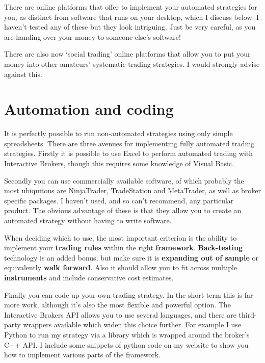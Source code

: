 There are online platforms that offer to implement your automated strategies for you, as distinct from software that runs on your desktop, which I discuss below. I haven't tested any of these but they look intriguing. Just be very careful, as you are handing over your money to someone else's software!

There are also now ‘social trading' online platforms that allow you to put your money into other amateurs' systematic trading strategies. I would strongly advise against this.

\section*{Automation and coding}  {}

It is perfectly possible to run non-automated strategies using only simple spreadsheets. There are three avenues for implementing fully automated trading strategies. Firstly it is possible to use Excel to perform automated trading with Interactive Brokers, though this requires some knowledge of Visual Basic.

Secondly you can use commercially available software, of which probably the most ubiquitous are NinjaTrader, TradeStation and MetaTrader, as well as broker specific packages. I haven't used, and so can't recommend, any particular product. The obvious advantage of these is that they allow you to create an automated strategy without having to write software.

When deciding which to use, the most important criterion is the ability to implement your \textbf{trading rules} within the right \textbf{framework}. \textbf{Back-testing} technology is an added bonus, but make sure it is \textbf{expanding out of sample} or equivalently \textbf{walk forward}. Also it should allow you to fit across multiple \textbf{instruments} and include conservative cost estimates.

Finally you can code up your own trading strategy. In the short term this is far more work, although it's also the most flexible and powerful option. The Interactive Brokers API allows you to use several languages, and there are third-party wrappers available which widen this choice further. For example I use Python to run my strategy via a library which is wrapped around the broker's C++ API. I include some snippets of python code on my website to show you how to implement various parts of the framework.
